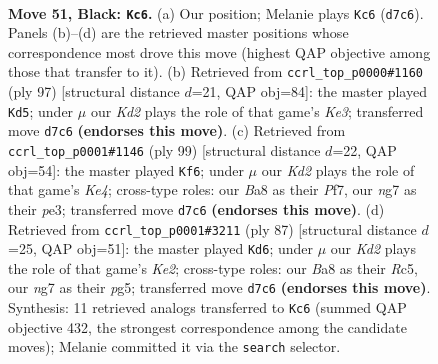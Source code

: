 \documentclass[11pt]{article}
\begin{document}
\clearpage

\begin{figure}[p]\centering
\begin{subfigure}{0.46\textwidth}\centering
\resizebox{\linewidth}{!}{%
\newchessgame
\chessboard[
  setfen={b5K1/P2k1pNP/8/4P3/8/3R4/5pr1/8 b - - 1 51},
  showmover=false,
  pgfstyle=straightmove, color=movearrow, markmove={d7-c6}
]}
\caption{}
\end{subfigure}\hfill
\begin{subfigure}{0.46\textwidth}\centering
\resizebox{\linewidth}{!}{%
\newchessgame
\chessboard[
  setfen={8/8/R3k3/4b1p1/6P1/5P2/1r2NK2/8 b - - 11 49},
  showmover=false,
  pgfstyle=straightmove, color=movearrow, markmove={e6-d5}
]}
\caption{}
\end{subfigure}
\\[4pt]
\begin{subfigure}{0.46\textwidth}\centering
\resizebox{\linewidth}{!}{%
\newchessgame
\chessboard[
  setfen={8/5p2/8/pR2k1p1/6P1/r3P3/5PK1/8 b - - 7 50},
  showmover=false,
  pgfstyle=straightmove, color=movearrow, markmove={e5-f6}
]}
\caption{}
\end{subfigure}\hfill
\begin{subfigure}{0.46\textwidth}\centering
\resizebox{\linewidth}{!}{%
\newchessgame
\chessboard[
  setfen={8/1R2k3/8/2rp1KP1/3b4/5P2/7P/8 b - - 3 44},
  showmover=false,
  pgfstyle=straightmove, color=movearrow, markmove={e7-d6}
]}
\caption{}
\end{subfigure}
\caption{\textbf{Move 51, Black: \texttt{Kc6}.} (a) Our position; Melanie plays \texttt{Kc6} (\texttt{d7c6}). Panels (b)--(d) are the retrieved master positions whose correspondence most drove this move (highest QAP objective among those that transfer to it). (b) Retrieved from \texttt{ccrl\_top\_p0000\#1160} (ply 97) [structural distance $d$=21, QAP obj=84]: the master played \texttt{Kd5}; under $\mu$ our \emph{Kd2} plays the role of that game's \emph{Ke3}; transferred move \texttt{d7c6} \textbf{(endorses this move)}. (c) Retrieved from \texttt{ccrl\_top\_p0001\#1146} (ply 99) [structural distance $d$=22, QAP obj=54]: the master played \texttt{Kf6}; under $\mu$ our \emph{Kd2} plays the role of that game's \emph{Ke4}; cross-type roles: our \emph{B}a8 as their \emph{P}f7, our \emph{n}g7 as their \emph{p}e3; transferred move \texttt{d7c6} \textbf{(endorses this move)}. (d) Retrieved from \texttt{ccrl\_top\_p0001\#3211} (ply 87) [structural distance $d$=25, QAP obj=51]: the master played \texttt{Kd6}; under $\mu$ our \emph{Kd2} plays the role of that game's \emph{Ke2}; cross-type roles: our \emph{B}a8 as their \emph{R}c5, our \emph{n}g7 as their \emph{p}g5; transferred move \texttt{d7c6} \textbf{(endorses this move)}. Synthesis: 11 retrieved analogs transferred to \texttt{Kc6} (summed QAP objective 432, the strongest correspondence among the candidate moves); Melanie committed it via the \texttt{search} selector.}
\label{fig:thought-m101}
\end{figure}
\end{document}
